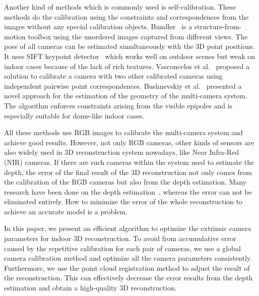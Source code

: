 Another kind of methods which is commonly used is self-calibration. These methods do the calibration using the constraints and correspondences from the images without any special calibration objects.
Bundler~\cite{snavely2006photo} is a structure-from-motion toolbox using the unordered images captured from different views. The pose of all cameras can be estimated simultaneously with the 3D point positions.
It uses SIFT keypoint detector~\cite{lowe2004distinctive} which works well on outdoor scenes but weak on indoor cases because of the lack of rich textures. Vasconcelos et al.~\cite{vasconcelos2012minimal} proposed a solution to calibrate a camera with two other calibrated cameras using independent pairwise point correspondences.
%
Bushnevskiy et al.~\cite{bushnevskiy2016multicamera} presented a novel approach for the estimation of the geometry of the multi-camera system. The algorithm enforces constraints arising from the visible epipoles and is especially suitable for dome-like indoor cases.

All these methods use RGB images to calibrate the multi-camera system and achieve good results. However, not only RGB cameras, other kinds of sensors are also widely used in 3D reconstruction system nowadays, like Near Infra-Red (NIR) cameras. If there are such cameras within the system used to estimate the depth, the error of the final result of the 3D reconstruction not only comes from the calibration of the RGB cameras but also from the depth estimation. Many research have been done on the depth estimation~\cite{scharstein,Bleyer2011PatchMatch}, whereas the error can not be eliminated entirely. How to minimize the error of the whole reconstruction to achieve an accurate model is a problem.

In this paper, we present an efficient algorithm to optimize the extrinsic camera parameters for indoor 3D reconstruction. To avoid from accumulative error caused by the repetitive calibration for each pair of cameras, we use a global camera calibration method and optimize all the camera parameters consistently. Furthermore, we use the point cloud registration method to adjust the result of the reconstruction. This can effectively decrease the error results from the depth estimation and obtain a high-quality 3D reconstruction.


